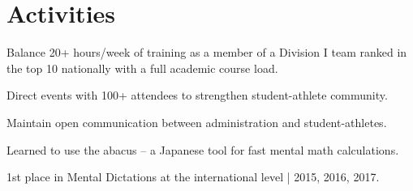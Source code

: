 \documentclass[]{deedy-resume-openfont}
\begin{document}
\begin{minipage}[t]{0.66\textwidth}


\section{Activities} 
\begin{tightemize}
    \item Balance 20+ hours/week of training as a member of a Division I team ranked in the top 10 nationally with a full academic course load.
\end{tightemize}
\sectionsep

\begin{tightemize}
    \item Direct events with 100+ attendees to strengthen student-athlete community.
    \item Maintain open communication between administration and student-athletes.
\end{tightemize}
\sectionsep

\descript{}
\begin{tightemize}
    \item Learned to use the abacus – a Japanese tool for fast mental math calculations. 
    \item 1st place in Mental Dictations at the international level | 2015, 2016, 2017.
\end{tightemize}

\end{minipage} 
\end{document}
